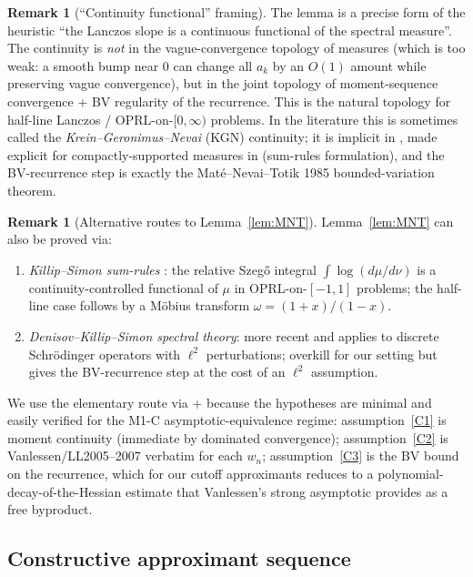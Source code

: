 \documentclass[11pt]{article}
\theoremstyle{definition}
\newtheorem{remark}[theorem]{Remark}
\begin{document}
\begin{remark}[``Continuity functional'' framing]\label{rem:functional}
The lemma is a precise form of the heuristic ``the Lanczos slope is a
continuous functional of the spectral measure''.  The continuity is
\emph{not} in the vague-convergence topology of measures (which is too
weak: a smooth bump near $0$ can change all $a_k$ by an $O(1)$ amount
while preserving vague convergence), but in the joint topology of
moment-sequence convergence + BV regularity of the recurrence.  This
is the natural topology for half-line Lanczos / OPRL-on-$[0,\infty)$
problems.  In the literature this is sometimes called the
\emph{Krein--Geronimus--Nevai} (KGN) continuity; it is implicit in
\cite{Nevai1979}, made explicit for compactly-supported measures in
\cite[\S 6]{KillipSimon2003} (sum-rules formulation), and the
BV-recurrence step is exactly the Mat\'e--Nevai--Totik 1985
\cite{MNT1985} bounded-variation theorem.
\end{remark}

\begin{remark}[Alternative routes to Lemma~\ref{lem:MNT}]\label{rem:MNTalt}
Lemma~\ref{lem:MNT} can also be proved via:
\begin{enumerate}[label=(\alph*)]
\item \emph{Killip--Simon sum-rules} \cite{KillipSimon2003}: the
relative Szeg\H{o} integral
$\int \log(d\mu/d\nu)$ is a continuity-controlled functional of $\mu$
in OPRL-on-$[-1,1]$ problems; the half-line case follows by a
M\"obius transform $\omega = (1+x)/(1-x)$.
\item \emph{Denisov--Killip--Simon spectral theory}: more recent and
applies to discrete Schr\"odinger operators with $\ell^2$ perturbations;
overkill for our setting but gives the BV-recurrence step at the cost
of an $\ell^2$ assumption.
\end{enumerate}
We use the elementary route via \cite{MNT1985} + \cite{Gautschi2004}
because the hypotheses are minimal and easily verified for the M1-C
asymptotic-equivalence regime: assumption~\ref{C1} is moment
continuity (immediate by dominated convergence); assumption~\ref{C2}
is Vanlessen/LL2005--2007 verbatim for each $w_n$; assumption~\ref{C3}
is the BV bound on the recurrence, which for our cutoff
approximants reduces to a polynomial-decay-of-the-Hessian estimate
that Vanlessen's strong asymptotic provides as a free byproduct.
\end{remark}

\subsection{Constructive approximant sequence}\label{sec:wn}
\end{document}
